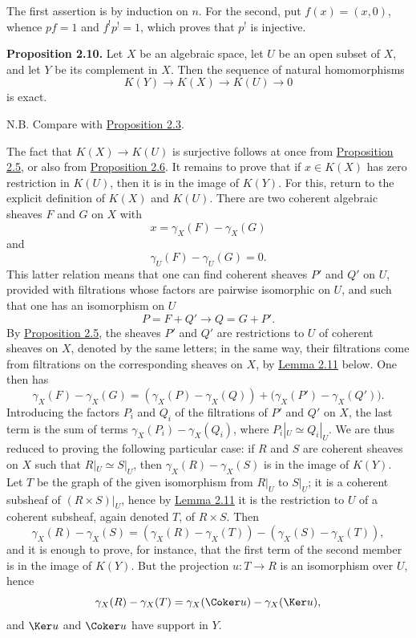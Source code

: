 The first assertion is by induction on $n$. For the second, put $f(x)=(x,0)$, whence $pf=1$ and $f^!p^!=1$, which proves that $p^!$ is injective.

\textbf{Proposition 2.10.} Let $X$ be an algebraic space, let $U$ be an open subset of $X$, and let $Y$ be its complement in $X$. Then the sequence of natural homomorphisms
\begin{equation}\tag{2.30}
 K(Y)\longrightarrow K(X)\longrightarrow K(U)\longrightarrow 0
\end{equation}
is exact.

N.B. Compare with \hyperlink{sga6.e00.prop.2-3}{Proposition 2.3}.

The fact that $K(X)\to K(U)$ is surjective follows at once from \hyperlink{sga6.e00.prop.2-5}{Proposition 2.5}, or also from \hyperlink{sga6.e00.prop.2-6}{Proposition 2.6}. It remains to prove that if $x\in K(X)$ has zero restriction in $K(U)$, then it is in the image of $K(Y)$. For this, return to the explicit definition of $K(X)$ and $K(U)$. There are two coherent algebraic sheaves $F$ and $G$ on $X$ with
\[
 x=\gamma_X(F)-\gamma_X(G)
\]
and
\[
 \gamma_U(F)-\gamma_U(G)=0.
\]
This latter relation means that one can find coherent sheaves $P'$ and $Q'$ on $U$, provided with filtrations whose factors are pairwise isomorphic on $U$, and such that one has an isomorphism on $U$
\[
 P=F+Q'\longrightarrow Q=G+P'.
\]
By \hyperlink{sga6.e00.prop.2-5}{Proposition 2.5}, the sheaves $P'$ and $Q'$ are restrictions to $U$ of coherent sheaves on $X$, denoted by the same letters; in the same way, their filtrations come from filtrations on the corresponding sheaves on $X$, by \hyperlink{sga6.e00.lem.2-11}{Lemma 2.11} below. One then has
\[
 \gamma_X(F)-\gamma_X(G)=(\gamma_X(P)-\gamma_X(Q))+\bigl(\gamma_X(P')-\gamma_X(Q')\bigr).
\]
Introducing the factors $P_i$ and $Q_i$ of the filtrations of $P'$ and $Q'$ on $X$, the last term is the sum of terms $\gamma_X(P_i)-\gamma_X(Q_i)$, where $P_i|_U\simeq Q_i|_U$. We are thus reduced to proving the following particular case: if $R$ and $S$ are coherent sheaves on $X$ such that $R|_U\simeq S|_U$, then $\gamma_X(R)-\gamma_X(S)$ is in the image of $K(Y)$. Let $T$ be the graph of the given isomorphism from $R|_U$ to $S|_U$; it is a coherent subsheaf of $(R\times S)|_U$, hence by \hyperlink{sga6.e00.lem.2-11}{Lemma 2.11} it is the restriction to $U$ of a coherent subsheaf, again denoted $T$, of $R\times S$. Then
\[
 \gamma_X(R)-\gamma_X(S)=(\gamma_X(R)-\gamma_X(T))-(\gamma_X(S)-\gamma_X(T)),
\]
and it is enough to prove, for instance, that the first term of the second member is in the image of $K(Y)$. But the projection $u:T\to R$ is an isomorphism over $U$, hence
\[
 \gamma_X(R)-\gamma_X(T)=\gamma_X(\Coker u)-\gamma_X(\Ker u),
\]
and $\Ker u$ and $\Coker u$ have support in $Y$.

